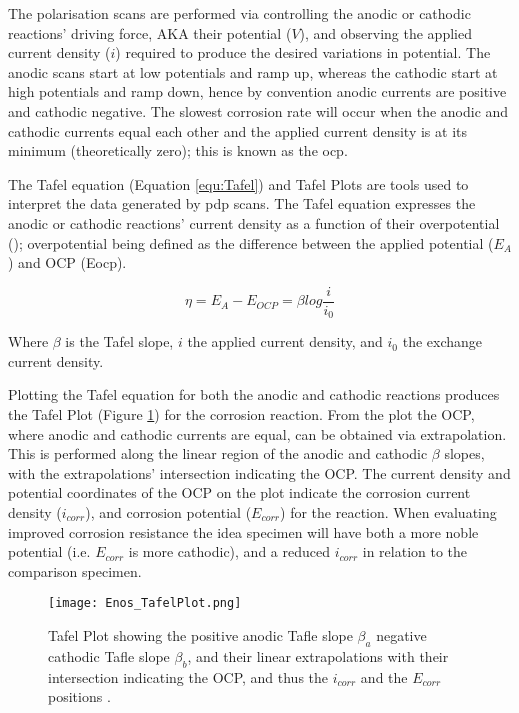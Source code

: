 \documentclass[a4paper,12pt,oneside]{report}%
\begin{document}
The polarisation scans are performed via controlling the anodic or cathodic reactions' driving force, AKA their potential ($V$), and observing the applied current density ($i$) required to produce the desired variations in potential. The anodic scans start at low potentials and ramp up, whereas the cathodic start at high potentials and ramp down, hence by convention anodic currents are positive and cathodic negative.  The slowest corrosion rate will occur when the anodic and cathodic currents equal each other and the applied current density is at its minimum (theoretically zero); this is known as the \gls{ocp}. 

The Tafel equation (Equation \ref{equ:Tafel}) and Tafel Plots are tools used to interpret the data generated by \gls{pdp} scans. The Tafel equation expresses the anodic or cathodic reactions' current density as a function of their overpotential (\n); overpotential being defined as the difference between the applied potential ($E_{A}$) and OCP (\acrshort{Eocp}).

\begin{equation}
\eta = E_{A} - E_{OCP}=\beta log \frac{i}{i_{0}}
\label{equ:Tafel}
\end{equation}

Where $\beta$ is the Tafel slope, $i$ the applied current density, and $i_{0}$ the exchange current density. 

Plotting the Tafel equation for both the anodic and cathodic reactions produces the Tafel Plot (Figure \ref{fig:EnosTafel}) for the corrosion reaction. From the plot the OCP, where anodic and cathodic currents are equal, can be obtained via extrapolation. This is performed along the linear region of the anodic and cathodic $\beta$ slopes, with the extrapolations' intersection indicating the OCP. The current density and potential coordinates of the OCP on the plot indicate the corrosion current density ($i_{corr}$), and corrosion potential ($E_{corr}$) for the reaction. When evaluating improved corrosion resistance the idea specimen will have both a more noble potential (i.e. $E_{corr}$ is more cathodic),  and a reduced $i_{corr}$ in relation to the comparison specimen.

\begin{figure}[htbp]
	\centering
	\texttt{[image: Enos\_TafelPlot.png]}
	\caption[Tafel Plot showing the positive anodic Tafle slope $\beta_{a}$ negative cathodic Tafle slope $\beta_{b}$, and their linear extrapolations with their intersection indicating the OCP, and thus the $i_{corr}$ and the $E_{corr}$ positions.]{Tafel Plot showing the positive anodic Tafle slope $\beta_{a}$ negative cathodic Tafle slope $\beta_{b}$, and their linear extrapolations with their intersection indicating the OCP, and thus the $i_{corr}$ and the $E_{corr}$ positions \cite{Enos1997}.}
	\label{fig:EnosTafel}
\end{figure}
\end{document}
